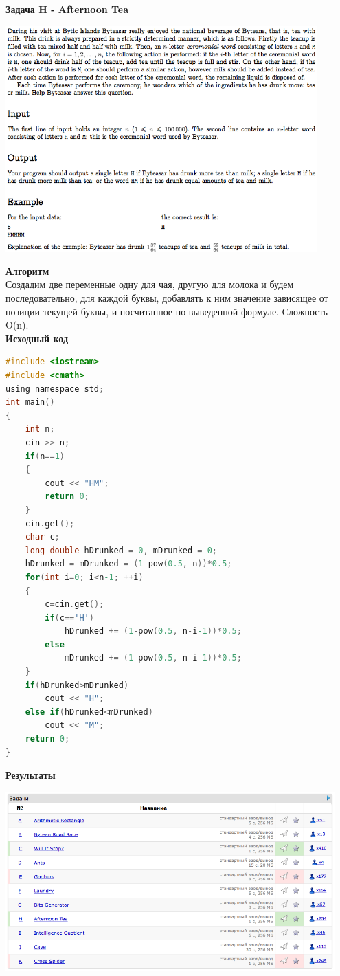 \documentclass[a4paper,12pt]{article}
\begin{document}
\newpage
\textbf{{\large Задача H - Afternoon Tea}} \\
\begin{center}
\includegraphics[width=0.9\textwidth]{CT_S02E07/CT_S02E07_H.png}\\ [1cm]
\end{center}
\textbf{{\large Алгоритм}} \\
Создадим две переменные одну для чая, другую для молока и будем последовательно, для каждой буквы, добавлять к ним значение зависящее от позиции текущей буквы, и посчитанное по выведенной формуле. Сложность O(n). \\ 

\textbf{{\large Исходный код}}
\begin{lstlisting}[language=C]
#include <iostream>
#include <cmath>
using namespace std;
int main()
{
    int n;
    cin >> n;
    if(n==1)
    {
        cout << "HM";
        return 0;
    }
    cin.get();
    char c;
    long double hDrunked = 0, mDrunked = 0;
    hDrunked = mDrunked = (1-pow(0.5, n))*0.5;
    for(int i=0; i<n-1; ++i)
    {
        c=cin.get();
        if(c=='H')
            hDrunked += (1-pow(0.5, n-i-1))*0.5;
        else
            mDrunked += (1-pow(0.5, n-i-1))*0.5;
    }
    if(hDrunked>mDrunked)
        cout << "H";
    else if(hDrunked<mDrunked)
        cout << "M";
    return 0;
}
\end{lstlisting}

\textbf{{\large Результаты}} \\
\begin{center}
\includegraphics[width=0.95\textwidth]{CT_S02E07/CT_S02E07_result.png}\\ [1cm]
\end{center}
\end{document}
